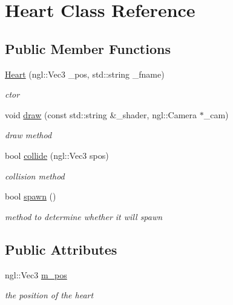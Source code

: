 \hypertarget{class_heart}{\section{Heart Class Reference}
\label{class_heart}
}
\subsection*{Public Member Functions}
\begin{DoxyCompactItemize}
\item 
\hyperlink{class_heart_a10e7414c251624a7394c8e49ff7e6b92}{Heart} (ngl\-::\-Vec3 \-\_\-pos, std\-::string \-\_\-fname)
\begin{DoxyCompactList}\small\item\em ctor \end{DoxyCompactList}\item 
void \hyperlink{class_heart_a2a262356476149c5c08cd40cc0d6e762}{draw} (const std\-::string \&\-\_\-shader, ngl\-::\-Camera $\ast$\-\_\-cam)
\begin{DoxyCompactList}\small\item\em draw method \end{DoxyCompactList}\item 
bool \hyperlink{class_heart_a609cd2acaccbcd8230e9ce10d2c82ad9}{collide} (ngl\-::\-Vec3 spos)
\begin{DoxyCompactList}\small\item\em collision method \end{DoxyCompactList}\item 
\hypertarget{class_heart_a33fcca1d7d422d827924ef052636eb60}{bool \hyperlink{class_heart_a33fcca1d7d422d827924ef052636eb60}{spawn} ()}\label{class_heart_a33fcca1d7d422d827924ef052636eb60}

\begin{DoxyCompactList}\small\item\em method to determine whether it will spawn \end{DoxyCompactList}\end{DoxyCompactItemize}
\subsection*{Public Attributes}
\begin{DoxyCompactItemize}
\item 
\hypertarget{class_heart_a5b4ac61c0cceedc82cfc47ba5acbea4c}{ngl\-::\-Vec3 \hyperlink{class_heart_a5b4ac61c0cceedc82cfc47ba5acbea4c}{m\-\_\-pos}}\label{class_heart_a5b4ac61c0cceedc82cfc47ba5acbea4c}

\begin{DoxyCompactList}\small\item\em the position of the heart \end{DoxyCompactList}\end{DoxyCompactItemize}



